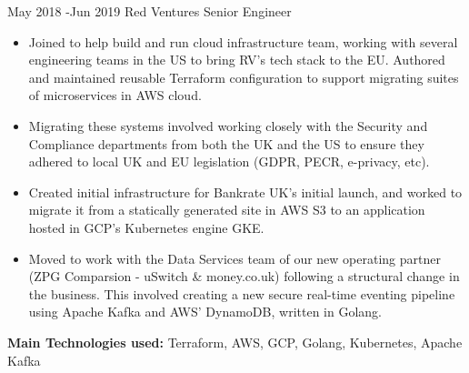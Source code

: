 \documentclass[10pt]{article} %
\begin{document}
\jobheader
{May 2018 -}{Jun 2019}
{Red Ventures}
{Senior Engineer}
\vspace{-1cm}
  \begin{itemize}

  \item Joined to help build and run cloud infrastructure team, working
        with several engineering teams in the US to bring RV's tech stack to the EU.
        Authored and maintained reusable Terraform configuration to support migrating
        suites of microservices in AWS cloud.

  \item Migrating these systems involved working closely with the Security
        and Compliance departments from both the UK and the US to ensure they
        adhered to local UK and EU legislation (GDPR, PECR, e-privacy, etc).

  \item Created initial infrastructure for Bankrate UK's initial launch, and worked
        to migrate it from a statically generated site in AWS S3 to an application hosted
        in GCP's Kubernetes engine GKE.

  \item Moved to work with the Data Services team of our new operating partner
        (ZPG Comparsion - uSwitch \& money.co.uk) following a structural change
        in the business. This involved creating a new secure real-time eventing
        pipeline using Apache Kafka and AWS' DynamoDB, written in Golang.

  \end{itemize}

  \textbf{Main Technologies used:}
  Terraform, AWS, GCP, Golang, Kubernetes, Apache Kafka
\end{document}
